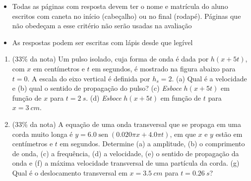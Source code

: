 \documentclass[12pt,a4paper,brazilian, fleqn]{article}
\DeclareMathOperator{\sen}{sen}
\newcommand{\ratio}[1]{(#1\% da nota)}
\begin{document}
\begin{tcolorbox}[colback=black!10, colframe=black!50, title=Observações]
    \begin{itemize}
        \item Todas as páginas com resposta devem ter o nome e matrícula do aluno
            escritos com caneta no início (cabeçalho) ou no final (rodapé). Páginas
            que não obedeçam a esse critério não serão usadas na avaliação
        \item As respostas podem ser escritas com lápis desde que legível
    \end{itemize}
\end{tcolorbox}

\begin{enumerate}
    \item \ratio{33} Um pulso isolado, cuja forma de onda é dada por \(h(x + 5t)\), com \(x\) em centímetros e 
        \(t\) em segundos, é mostrado na figura abaixo para \(t = 0\). A escala do eixo vertical é definida 
        por \(h_s = 2\). (a) Qual é a velocidade e (b) qual o sentido de propagação do pulso? 
        (c) \textit{Esboce} \(h(x + 5t)\) em função de \(x\) para \(t = \SI{2}{s}\). (d) \textit{Esboce} \(h(x + 5t)\)
        em função de \(t\) para \(x = \SI{3}{cm}\).

        \begin{center}
        \end{center}

    \item \ratio{33} A equação de uma onda transversal que se propaga em uma corda muito longa é 
        \(y = \num{6.0} \sen{(\num{0.020}\pi x + \num{4.0}\pi t)}\), em que \(x\) e
        \(y\) estão em centímetros e \(t\) em segundos. Determine (a) a amplitude,
        (b) o comprimento de onda, (c) a frequência, (d) a velocidade, (e) o 
        sentido de propagação da onda e (f) a máxima velocidade transversal de uma 
        partícula da corda. (g) Qual é o deslocamento transversal em 
        \( x = \SI{3.5}{cm}\) para \(t = \SI{0,26}{s}\)?


\end{enumerate}
\end{document}
